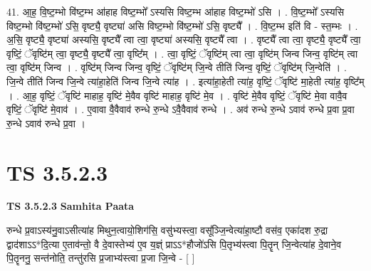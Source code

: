 \documentclass[17pt]{extarticle}
\begin{document}
41. आ॒ह॒ वि॒ष्ट॒म्भो वि॑ष्ट॒म्भ आ॑हाह विष्ट॒म्भो᳚ ऽस्यसि विष्ट॒म्भ आ॑हाह विष्ट॒म्भो॑ ऽसि । . वि॒ष्ट॒म्भो᳚ ऽस्यसि विष्ट॒म्भो वि॑ष्ट॒म्भो॑ ऽसि॒ वृष्ट्यै॒ वृष्ट्या॑ असि विष्ट॒म्भो वि॑ष्ट॒म्भो॑ ऽसि॒ वृष्ट्यै᳚ । . वि॒ष्ट॒म्भ इति॑ वि - स्त॒म्भः । . अ॒सि॒ वृष्ट्यै॒ वृष्ट्या॑ अस्यसि॒ वृष्ट्यै᳚ त्वा त्वा॒ वृष्ट्या॑ अस्यसि॒ वृष्ट्यै᳚ त्वा । . वृष्ट्यै᳚ त्वा त्वा॒ वृष्ट्यै॒ वृष्ट्यै᳚ त्वा॒ वृष्टिं॒ ॅवृष्टि॑म् त्वा॒ वृष्ट्यै॒ वृष्ट्यै᳚ त्वा॒ वृष्टि᳚म् । . त्वा॒ वृष्टिं॒ ॅवृष्टि॑म् त्वा त्वा॒ वृष्टि॑म् जिन्व जिन्व॒ वृष्टि॑म् त्वा त्वा॒ वृष्टि॑म् जिन्व । . वृष्टि॑म् जिन्व जिन्व॒ वृष्टिं॒ ॅवृष्टि॑म् जि॒न्वे तीति॑ जिन्व॒ वृष्टिं॒ ॅवृष्टि॑म् जि॒न्वेति॑ । . जि॒न्वे तीति॑ जिन्व जि॒न्वे त्या॑हा॒हेति॑ जिन्व जि॒न्वे त्या॑ह । . इत्या॑हा॒हेती त्या॑ह॒ वृष्टिं॒ ॅवृष्टि॑ मा॒हेती त्या॑ह॒ वृष्टि᳚म् । . आ॒ह॒ वृष्टिं॒ ॅवृष्टि॑ माहाह॒ वृष्टि॑ मे॒वैव वृष्टि॑ माहाह॒ वृष्टि॑ मे॒व । . वृष्टि॑ मे॒वैव वृष्टिं॒ ॅवृष्टि॑ मे॒वा वावै॒व वृष्टिं॒ ॅवृष्टि॑ मे॒वाव॑ । . ए॒वावा वै॒वैवाव॑ रुन्धे रु॒न्धे ऽवै॒वैवाव॑ रुन्धे । . अव॑ रुन्धे रु॒न्धे ऽवाव॑ रुन्धे प्र॒वा प्र॒वा रु॒न्धे ऽवाव॑ रुन्धे प्र॒वा । \newline
\pagebreak
{}

\section{ TS 3.5.2.3 }

\textbf{TS 3.5.2.3 } \newline
\textbf{Samhita Paata} \newline

रुन्धे प्र॒वाऽस्य॑नु॒वाऽसीत्या॑ह मिथुन॒त्वायो॒शिग॑सि॒ वसु॑भ्यस्त्वा॒ वसू᳚ञ्जि॒न्वेत्या॑हा॒ष्टौ वस॑व॒ एका॑दश रु॒द्रा द्वाद॑शाऽऽ*दि॒त्या ए॒ताव॑न्तो॒ वै दे॒वास्तेभ्य॑ ए॒व य॒ज्ञ्ं प्राऽऽ*हौजो॑ऽसि पि॒तृभ्य॑स्त्वा पि॒तॄन् जि॒न्वेत्या॑ह दे॒वाने॒व पि॒तॄननु॒ सन्त॑नोति॒ तन्तु॑रसि प्र॒जाभ्य॑स्त्वा प्र॒जा जि॒न्वे - [  ] \newline
\end{document}
